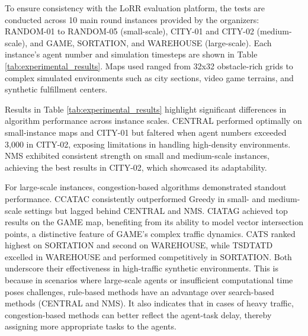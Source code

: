 \documentclass[letterpaper]{article} %
\begin{document}
To ensure consistency with the LoRR evaluation platform, the tests are conducted across 10 main round instances provided by the organizers: RANDOM-01 to RANDOM-05 (small-scale), CITY-01 and CITY-02 (medium-scale), and GAME, SORTATION, and WAREHOUSE (large-scale). 
Each instance's agent number and simulation timesteps are shown in Table \ref{tab:experimental_results}. 
Maps used ranged from 32x32 obstacle-rich grids to complex simulated environments such as city sections, video game terrains, and synthetic fulfillment centers. 


Results in Table \ref{tab:experimental_results} highlight significant differences in algorithm performance across instance scales. 
CENTRAL performed optimally on small-instance maps and CITY-01 but faltered when agent numbers exceeded 3,000 in CITY-02, exposing limitations in handling high-density environments. 
NMS exhibited consistent strength on small and medium-scale instances, achieving the best results in CITY-02, which showcased its adaptability. 

For large-scale instances, congestion-based algorithms demonstrated standout performance. 
CCATAC consistently outperformed Greedy in small- and medium-scale settings but lagged behind CENTRAL and NMS. 
CIATAG achieved top results on the GAME map, benefiting from its ability to model vector intersection points, a distinctive feature of GAME's complex traffic dynamics. 
CATS ranked highest on SORTATION and second on WAREHOUSE, while TSDTATD excelled in WAREHOUSE and performed competitively in SORTATION. 
Both underscore their effectiveness in high-traffic synthetic environments. 
This is because in scenarios where large-scale agents or insufficient computational time poses challenges, rule-based methods have an advantage over search-based methods (CENTRAL and NMS). 
It also indicates that in cases of heavy traffic, congestion-based methods can better reflect the agent-task delay, thereby assigning more appropriate tasks to the agents. 
 
\end{document}
